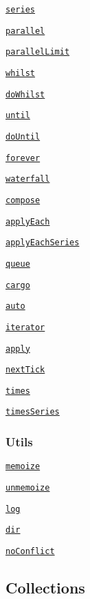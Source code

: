 \begin{DoxyItemize}
\item \href{#series}{\tt series}
\item \href{#parallel}{\tt parallel}
\item \href{#parallellimittasks-limit-callback}{\tt parallel\+Limit}
\item \href{#whilst}{\tt whilst}
\item \href{#doWhilst}{\tt do\+Whilst}
\item \href{#until}{\tt until}
\item \href{#doUntil}{\tt do\+Until}
\item \href{#forever}{\tt forever}
\item \href{#waterfall}{\tt waterfall}
\item \href{#compose}{\tt compose}
\item \href{#applyEach}{\tt apply\+Each}
\item \href{#applyEachSeries}{\tt apply\+Each\+Series}
\item \href{#queue}{\tt queue}
\item \href{#cargo}{\tt cargo}
\item \href{#auto}{\tt auto}
\item \href{#iterator}{\tt iterator}
\item \href{#apply}{\tt apply}
\item \href{#nextTick}{\tt next\+Tick}
\item \href{#times}{\tt times}
\item \href{#timesSeries}{\tt times\+Series}
\end{DoxyItemize}

\subsubsection*{Utils}


\begin{DoxyItemize}
\item \href{#memoize}{\tt memoize}
\item \href{#unmemoize}{\tt unmemoize}
\item \href{#log}{\tt log}
\item \href{#dir}{\tt dir}
\item \href{#noConflict}{\tt no\+Conflict}
\end{DoxyItemize}

\subsection*{Collections}

